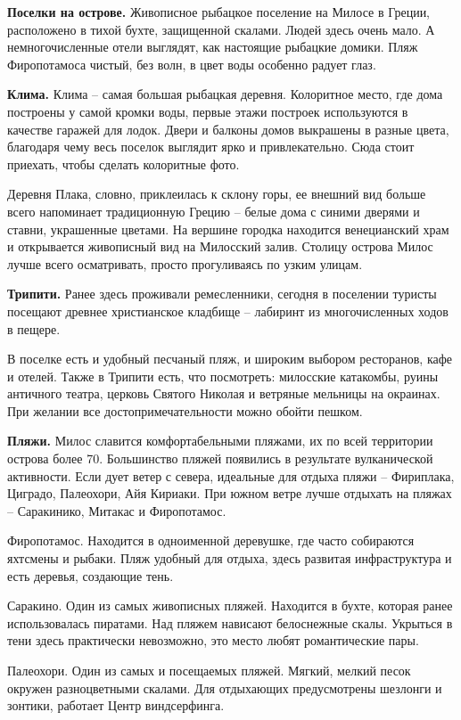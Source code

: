 \textbf{Поселки на острове.}
Живописное рыбацкое поселение на Милосе в Греции, расположено в тихой бухте, защищенной скалами. Людей здесь очень мало. А немногочисленные отели выглядят, как настоящие рыбацкие домики. Пляж Фиропотамоса чистый, без волн, в цвет воды особенно радует глаз.

\textbf{Клима.} Клима – самая большая рыбацкая деревня. Колоритное место, где дома построены у самой кромки воды, первые этажи построек используются в качестве гаражей для лодок. Двери и балконы домов выкрашены в разные цвета, благодаря чему весь поселок выглядит ярко и привлекательно. Сюда стоит приехать, чтобы сделать колоритные фото.

Деревня Плака, словно, приклеилась к склону горы, ее внешний вид больше всего напоминает традиционную Грецию – белые дома с синими дверями и ставни, украшенные цветами. На вершине городка находится венецианский храм и открывается живописный вид на Милосский залив. Столицу острова Милос лучше всего осматривать, просто прогуливаясь по узким улицам.

\textbf{Трипити.}
Ранее здесь проживали ремесленники, сегодня в поселении туристы посещают древнее христианское кладбище – лабиринт из многочисленных ходов в пещере.

В поселке есть и удобный песчаный пляж, и широким выбором ресторанов, кафе и отелей. Также в Трипити есть, что посмотреть: милосские катакомбы, руины античного театра, церковь Святого Николая и ветряные мельницы на окраинах. При желании все достопримечательности можно обойти пешком.

\textbf{Пляжи.}
Милос славится комфортабельными пляжами, их по всей территории острова более 70. Большинство пляжей появились в результате вулканической активности. Если дует ветер с севера, идеальные для отдыха пляжи – Фириплака, Циградо, Палеохори, Айя Кириаки. При южном ветре лучше отдыхать на пляжах – Саракинико, Митакас и Фиропотамос.

Фиропотамос. Находится в одноименной деревушке, где часто собираются яхтсмены и рыбаки. Пляж удобный для отдыха, здесь развитая инфраструктура и есть деревья, создающие тень.

Саракино. Один из самых живописных пляжей. Находится в бухте, которая ранее использовалась пиратами. Над пляжем нависают белоснежные скалы. Укрыться в тени здесь практически невозможно, это место любят романтические пары.

Палеохори. Один из самых и посещаемых пляжей. Мягкий, мелкий песок окружен разноцветными скалами. Для отдыхающих предусмотрены шезлонги и зонтики, работает Центр виндсерфинга.

